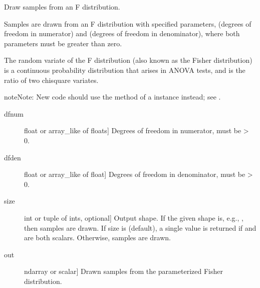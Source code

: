 \documentclass[letterpaper,10pt,english]{sphinxmanual}
\begin{document}

\begin{fulllineitems}
\label{\detokenize{infrapy.utils:infrapy.utils.ref2sac.f}}
Draw samples from an F distribution.

Samples are drawn from an F distribution with specified parameters,
 (degrees of freedom in numerator) and  (degrees of
freedom in denominator), where both parameters must be greater than
zero.

The random variate of the F distribution (also known as the
Fisher distribution) is a continuous probability distribution
that arises in ANOVA tests, and is the ratio of two chi\sphinxhyphen{}square
variates.

\begin{sphinxadmonition}{note}{Note:}
New code should use the  method of a 
instance instead; see .
\end{sphinxadmonition}
\begin{description}
\item[{dfnum}] \leavevmode{[}float or array\_like of floats{]}
Degrees of freedom in numerator, must be \textgreater{} 0.

\item[{dfden}] \leavevmode{[}float or array\_like of float{]}
Degrees of freedom in denominator, must be \textgreater{} 0.

\item[{size}] \leavevmode{[}int or tuple of ints, optional{]}
Output shape.  If the given shape is, e.g., , then
 samples are drawn.  If size is  (default),
a single value is returned if  and  are both scalars.
Otherwise,  samples are drawn.

\end{description}
\begin{description}
\item[{out}] \leavevmode{[}ndarray or scalar{]}
Drawn samples from the parameterized Fisher distribution.


\end{description}
\end{fulllineitems}
\end{document}
